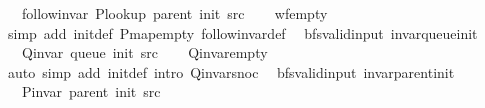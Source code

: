 \begin{isabellebody}
\ \ \ {\isachardoublequoteopen}follow{\isacharunderscore}{\kern0pt}invar\ {\isacharparenleft}{\kern0pt}P{\isacharunderscore}{\kern0pt}lookup\ {\isacharparenleft}{\kern0pt}parent\ {\isacharparenleft}{\kern0pt}init\ src{\isacharparenright}{\kern0pt}{\isacharparenright}{\kern0pt}{\isacharparenright}{\kern0pt}{\isachardoublequoteclose}\isanewline
%
\isadelimproof
\ \ %
\endisadelimproof
%
\isatagproof
{}\isamarkupfalse%
\ wf{\isacharunderscore}{\kern0pt}empty\isanewline
\ \ \isamarkupfalse%
\ {\isacharparenleft}{\kern0pt}simp\ add{\isacharcolon}{\kern0pt}\ init{\isacharunderscore}{\kern0pt}def\ P{\isachardot}{\kern0pt}map{\isacharunderscore}{\kern0pt}empty\ follow{\isacharunderscore}{\kern0pt}invar{\isacharunderscore}{\kern0pt}def{\isacharparenright}{\kern0pt}%
\endisatagproof
{\isafoldproof}%
%
\isadelimproof
\isanewline
%
\endisadelimproof
\isanewline
{}\isamarkupfalse%
\ {\isacharparenleft}{\kern0pt}\ bfs{\isacharunderscore}{\kern0pt}valid{\isacharunderscore}{\kern0pt}input{\isacharparenright}{\kern0pt}\ invar{\isacharunderscore}{\kern0pt}queue{\isacharunderscore}{\kern0pt}init{\isacharcolon}{\kern0pt}\isanewline
\ \ \ {\isachardoublequoteopen}Q{\isacharunderscore}{\kern0pt}invar\ {\isacharparenleft}{\kern0pt}queue\ {\isacharparenleft}{\kern0pt}init\ src{\isacharparenright}{\kern0pt}{\isacharparenright}{\kern0pt}{\isachardoublequoteclose}\isanewline
%
\isadelimproof
\ \ %
\endisadelimproof
%
\isatagproof
{}\isamarkupfalse%
\ Q{\isachardot}{\kern0pt}invar{\isacharunderscore}{\kern0pt}empty\isanewline
\ \ \isamarkupfalse%
\ {\isacharparenleft}{\kern0pt}auto\ simp\ add{\isacharcolon}{\kern0pt}\ init{\isacharunderscore}{\kern0pt}def\ intro{\isacharcolon}{\kern0pt}\ Q{\isachardot}{\kern0pt}invar{\isacharunderscore}{\kern0pt}snoc{\isacharparenright}{\kern0pt}%
\endisatagproof
{\isafoldproof}%
%
\isadelimproof
\isanewline
%
\endisadelimproof
\isanewline
{}\isamarkupfalse%
\ {\isacharparenleft}{\kern0pt}\ bfs{\isacharunderscore}{\kern0pt}valid{\isacharunderscore}{\kern0pt}input{\isacharparenright}{\kern0pt}\ invar{\isacharunderscore}{\kern0pt}parent{\isacharunderscore}{\kern0pt}init{\isacharcolon}{\kern0pt}\isanewline
\ \ \ {\isachardoublequoteopen}P{\isacharunderscore}{\kern0pt}invar\ {\isacharparenleft}{\kern0pt}parent\ {\isacharparenleft}{\kern0pt}init\ src{\isacharparenright}{\kern0pt}{\isacharparenright}{\kern0pt}{\isachardoublequoteclose}\isanewline
%
\isadelimproof
\ \ %
\endisadelimproof

\end{isabellebody}
